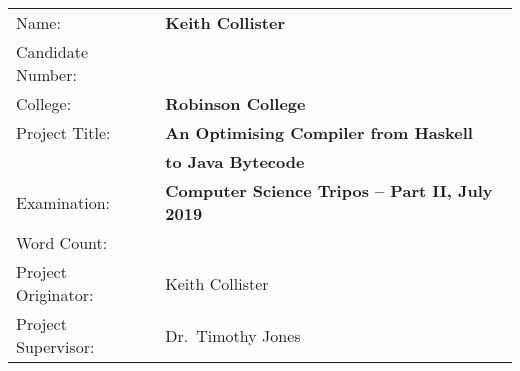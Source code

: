 \documentclass[dissertation.tex]{subfiles}
\begin{document}
{\large
\begin{tabular}{ll}
Name:               & \textbf{Keith Collister} \\
Candidate Number:   & \textbf{} \\
College:            & \textbf{Robinson College} \\
Project Title:      & \textbf{An Optimising Compiler from Haskell} \\
                    & \textbf{to Java Bytecode} \\
Examination:        & \textbf{Computer Science Tripos -- Part II, July 2019} \\
Word Count:         & \textbf{} \\
Project Originator: & Keith Collister \\
Project Supervisor: & Dr.\ Timothy Jones \\ 
\end{tabular}
}
\end{document}
